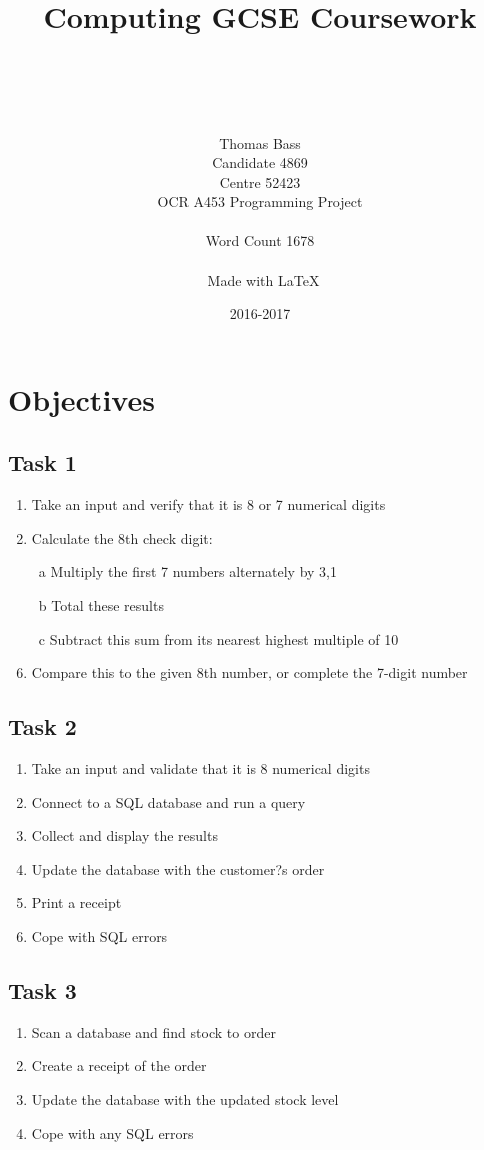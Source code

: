 \documentclass[a4paper]{article}
\title{Computing GCSE Coursework}
\author{\\ \\ \\ \\ Thomas Bass\\Candidate 4869\\Centre 52423\\OCR A453 Programming Project\\\\ Word Count 1678 \\\\\ Made with \LaTeX}
\date{2016-2017}
\begin{document}
\maketitle
\pagebreak
\renewcommand*\contentsname{Summary}
\tableofcontents
\pagebreak
\section{Objectives}

\subsection{Task 1}
\begin{enumerate}
\item{Take an input and verify that it is 8 or 7 numerical digits}
\item{Calculate the 8th check digit:}
\item[~a]{Multiply the first 7 numbers alternately by 3,1}
\item[~b]{Total these results}
\item[~c]{Subtract this sum from its nearest highest multiple of 10}
\item{Compare this to the given 8th number, or complete the 7-digit number}
\end{enumerate}

\subsection{Task 2}
\begin{enumerate}
\item{Take an input and validate that it is 8 numerical digits}
\item{Connect to a SQL database and run a query}
\item{Collect and display the results}
\item{Update the database with the customer?s order}
\item{Print a receipt}
\item{Cope with SQL errors}
\end{enumerate}

\subsection{Task 3}
\begin{enumerate}
\item{Scan a database and find stock to order}
\item{Create a receipt of the order}
\item{Update the database with the updated stock level}
\item{Cope with any SQL errors}
\end{enumerate}
\end{document}
